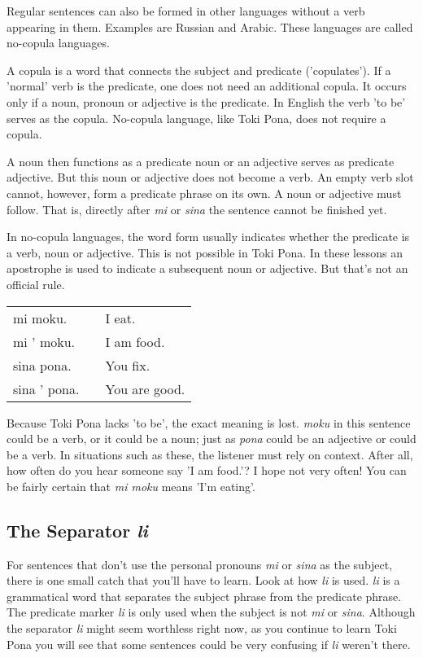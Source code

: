 Regular sentences can also be formed in other languages without a verb appearing in them.
Examples are Russian and Arabic.
These languages are called no-copula languages.

A copula is a word that connects the subject and predicate ('copulates').
If a 'normal' verb is the predicate, one does not need an additional copula.
It occurs only if a noun, pronoun or adjective is the predicate.
In English the verb 'to be' serves as the copula.
No-copula language, like Toki Pona, does not require a copula.

A noun then functions as a predicate noun or an adjective serves as predicate adjective.
But this noun or adjective does not become a verb.
An empty verb slot cannot, however, form a predicate phrase on its own.
A noun or adjective must follow.
That is, directly after \textit{mi} or \textit{sina} the sentence cannot be finished yet.

In no-copula languages, the word form usually indicates whether the predicate is a verb, noun or adjective.
This is not possible in Toki Pona.
In these lessons an apostrophe is used to indicate a subsequent noun or adjective.
But that's not an official rule.

\begin{supertabular}{p{5cm}|ll}
    mi moku.     &  & I eat.        \\
    mi ' moku.   &  & I am food.    \\
    sina pona.   &  & You fix.      \\
    sina ' pona. &  & You are good. \\
\end{supertabular}

Because Toki Pona lacks 'to be', the exact meaning is lost.
\textit{moku} in this sentence could be a verb, or it could be a noun; just as \textit{pona} could be an adjective or could be a verb.
In situations such as these, the listener must rely on context.
After all, how often do you hear someone say 'I am food.'?
I hope not very often! You can be fairly certain that \textit{mi moku} means 'I'm eating'.

%
\newpage
\subsection*{The Separator \textit{li} }
%
%
For sentences that don't use the personal pronouns \textit{mi} or \textit{sina} as the subject, there is one small catch that you'll have to learn.
Look at how \textit{li} is used.
\textit{li} is a grammatical word that separates the subject phrase from the predicate phrase.
The predicate marker \textit{li} is only used when the subject is not \textit{mi} or \textit{sina}.
Although the separator \textit{li} might seem worthless right now, as you continue to learn Toki Pona you will see that some sentences could be very confusing if \textit{li} weren't there.


